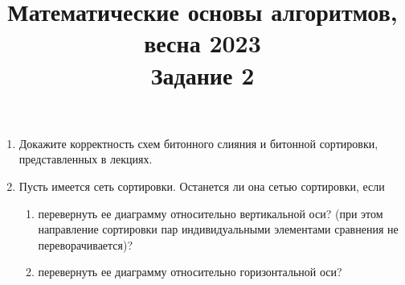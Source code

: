 \documentclass[11pt]{article}
\newenvironment{exercise}{\item}{}
\newcommand{\solution}[1]{}
\begin{document}
 \title{Математические основы алгоритмов, весна 2023 \\ Задание 2}
 \date{}
 \author{}
 \maketitle

\begin{enumerate}

\begin{exercise}
Докажите корректность схем битонного слияния и битонной сортировки, представленных в лекциях.
\end{exercise}

\begin{exercise}
Пусть имеется сеть сортировки. Останется ли она сетью сортировки, если

\begin{enumerate}
\item перевернуть ее диаграмму относительно вертикальной оси?
(при этом направление сортировки пар индивидуальными элементами сравнения не переворачивается)?

\solution{
True. Let $x_i$, $0 \leq i < n$, be the input to the modified network.
Consider $-x_{n-i}$, $0 \leq i < n$, as the input to the original network.
A comparator between a pair of lines $(i,j)$ exists in the modified network,
if and only if a comparator between the pair $(n-j,n-i)$ exists in the original network
at the same level.
Let a comparator in the top level of the modified network take inputs $x$, $y$;
then, the corresponding comparator in the original network takes inputs $-y$, $-x$ in that order.
We have $x < y$ if and only if $-y < -x$,
therefore one of the comparators swaps the inputs if and only if the other swaps.
Therefore, after passing through the first level of comparators,
we still have a value $x$ in line $k$ of the modified network,
if and only if we have value $-x$ in line $n-k$ of the original network.
By induction, this holds for every level in the network, including the output.
Let $y_i$, $0 \leq i < n$, be the output of the modified network.
Then, as shown above,
$-y_{n-i}$, $0 \leq i < n$, is the output to the original network.
Since the original network is a sorting network,
we have $-y_{n-i} < -y_{n-j}$ whenever $i < j$, 
therefore we have $-y_i < -y_j$ whenever $n-i < n-j$, 
i.e.\ $y_i > y_j$ whenever $i > j$.
Hence, the output of the modified network is sorted.
Since we assumed an arbitrary input, the modified network is a sorting network.
}

\item перевернуть ее диаграмму относительно горизонтальной оси?


\end{enumerate}
\end{exercise}
\end{enumerate}
\end{document}
